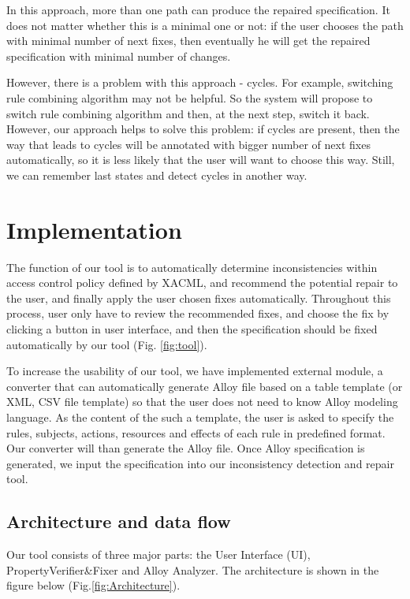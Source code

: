 \documentclass[letterpaper]{acm_proc_article-sp}
\begin{document}
In this approach, more than one path can produce the repaired specification. It does not matter whether this is a minimal one or not: if the user chooses the path with minimal number of next fixes, then eventually he will get the repaired specification with minimal number of changes.

However, there is a problem with this approach - cycles. For example, switching rule combining algorithm may not be helpful. So the system will propose to switch rule combining algorithm and then, at the next step, switch it back. However, our approach helps to solve this problem: if cycles are present, then the way that leads to cycles will be annotated with bigger number of next fixes automatically, so it is less likely that the user will want to choose this way. Still, we can remember last states and detect cycles in another way.

\section{Implementation}
The function of our tool is to automatically determine inconsistencies within access control policy defined by XACML, and recommend the potential repair to the user, and finally apply the user chosen fixes automatically. Throughout this process, user only have to review the recommended fixes, and choose the fix by clicking a button in user interface, and then the specification should be fixed automatically by our tool (Fig. \ref{fig:tool}). 

To increase the usability of our tool, we have implemented external module, a converter that can automatically generate Alloy file based on a table template (or XML, CSV file template) so that the user does not need to know Alloy modeling language. As the content of the such a template, the user is asked to specify the rules, subjects, actions, resources and effects of each rule in predefined format. Our converter will than generate the Alloy file. Once Alloy specification is generated, we input the specification into our inconsistency detection and repair tool. 

\subsection{Architecture and data flow}

Our tool consists of three major parts: the User Interface (UI), PropertyVerifier\&Fixer and Alloy Analyzer. The architecture is shown in the figure below (Fig.\ref{fig:Architecture}).\\
\end{document}
